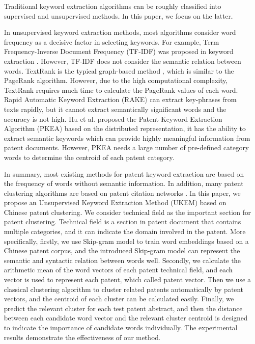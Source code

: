 \documentclass[conference]{IEEEtran}
\begin{document}
	Traditional keyword extraction algorithms can be roughly classified into supervised and unsupervised methods. In this paper, we focus on the latter.
	
	In unsupervised keyword extraction methods, most algorithms consider word frequency as a decisive factor in selecting keywords. For example, Term Frequency-Inverse Document Frequency (TF-IDF) was proposed in keyword extraction \cite{b5}. However, TF-IDF does not consider the semantic relation between words. TextRank is the typical graph-based method \cite{b6}, which is similar to the PageRank algorithm. However, due to the high computational complexity, TextRank requires much time to calculate the PageRank values of each word. Rapid Automatic Keyword Extraction (RAKE) \cite{b7} can extract key-phrases from texts rapidly, but it cannot extract semantically significant words and the accuracy is not high. Hu et al. \cite{b8} proposed the Patent Keyword Extraction Algorithm (PKEA) based on the distributed representation, it has the ability to extract semantic keywords which can provide highly meaningful information from patent documents. However, PKEA needs a large number of pre-defined category words to determine the centroid of each patent category.
	
	In summary, most existing methods for patent keyword extraction are based on the frequency of words without semantic information. In addition, many patent clustering algorithms are based on patent citation networks \cite{b9}. In this paper, we propose an Unsupervised Keyword Extraction Method (UKEM) based on Chinese patent clustering. We consider technical field as the important section for patent clustering. Technical field is a section in patent document that contains multiple categories, and it can indicate the domain involved in the patent. More specifically, firstly, we use Skip-gram model \cite{b10} to train word embeddings based on a Chinese patent corpus, and the introduced Skip-gram model can represent the semantic and syntactic relation between words well. Secondly, we calculate the arithmetic mean of the word vectors of each patent technical field, and each vector is used to represent each patent, which called patent vector. Then we use a classical clustering algorithm to cluster related patents automatically by patent vectors, and the centroid of each cluster can be calculated easily. Finally, we predict the relevant cluster for each test patent abstract, and then the distance between each candidate word vector and the relevant cluster centroid is designed to indicate the importance of candidate words individually. The experimental results demonstrate the effectiveness of our method.
	
\end{document}
